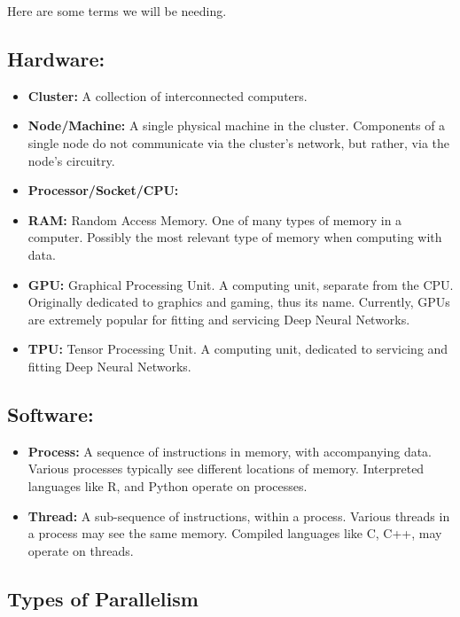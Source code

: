 \documentclass[]{book}
\providecommand{\tightlist}{%
  \setlength{\itemsep}{0pt}\setlength{\parskip}{0pt}}
\theoremstyle{definition}
\theoremstyle{definition}
\theoremstyle{definition}
\theoremstyle{remark}
\begin{document}
Here are some terms we will be needing.

\hypertarget{hardware}{%
\subsection{Hardware:}\label{hardware}}

\begin{itemize}
\tightlist
\item
  \textbf{Cluster:} A collection of interconnected computers.
\item
  \textbf{Node/Machine:} A single physical machine in the cluster. Components of a single node do not communicate via the cluster's network, but rather, via the node's circuitry.
\item
  \textbf{Processor/Socket/CPU:}
\item
  \textbf{RAM:} Random Access Memory. One of many types of memory in a computer. Possibly the most relevant type of memory when computing with data.
\item
  \textbf{GPU:} Graphical Processing Unit. A computing unit, separate from the CPU. Originally dedicated to graphics and gaming, thus its name. Currently, GPUs are extremely popular for fitting and servicing Deep Neural Networks.
\item
  \textbf{TPU:} Tensor Processing Unit. A computing unit, dedicated to servicing and fitting Deep Neural Networks.
\end{itemize}

\hypertarget{software}{%
\subsection{Software:}\label{software}}

\begin{itemize}
\tightlist
\item
  \textbf{Process:} A sequence of instructions in memory, with accompanying data. Various processes typically see different locations of memory. Interpreted languages like R, and Python operate on processes.
\item
  \textbf{Thread:} A sub-sequence of instructions, within a process. Various threads in a process may see the same memory. Compiled languages like C, C++, may operate on threads.
\end{itemize}

\hypertarget{types-of-parallelism}{%
\subsection{Types of Parallelism}\label{types-of-parallelism}}
\end{document}
